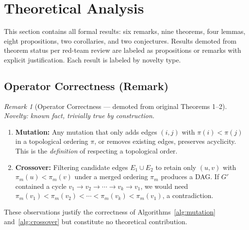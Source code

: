\documentclass{article}
\theoremstyle{definition}
\theoremstyle{plain}
\theoremstyle{remark}
\newtheorem{remark}{Remark}
\begin{document}


\section{Theoretical Analysis}
\label{sec:theory}

This section contains all formal results: six remarks, nine theorems, four lemmas,
eight propositions, two corollaries, and two conjectures. Results demoted from
theorem status per red-team review are labeled as propositions or remarks with
explicit justification. Each result is labeled by novelty type.

\subsection{Operator Correctness (Remark)}

\begin{remark}[Operator Correctness --- demoted from original Theorems 1--2]
\label{rem:operator}
\emph{Novelty: known fact, trivially true by construction.}

\begin{enumerate}
  \item \textbf{Mutation:} Any mutation that only adds edges $(i, j)$ with
    $\pi(i) < \pi(j)$ in a topological ordering $\pi$, or removes existing
    edges, preserves acyclicity. This is the \emph{definition} of respecting a
    topological order.
  \item \textbf{Crossover:} Filtering candidate edges $E_1 \cup E_2$ to retain
    only $(u, v)$ with $\pi_m(u) < \pi_m(v)$ under a merged ordering $\pi_m$
    produces a DAG. If $G'$ contained a cycle
    $v_1 \to v_2 \to \cdots \to v_k \to v_1$, we would need
    $\pi_m(v_1) < \pi_m(v_2) < \cdots < \pi_m(v_k) < \pi_m(v_1)$, a
    contradiction.
\end{enumerate}

These observations justify the correctness of Algorithms~\ref{alg:mutation}
and~\ref{alg:crossover} but constitute no theoretical contribution.
\end{remark}
\end{document}
